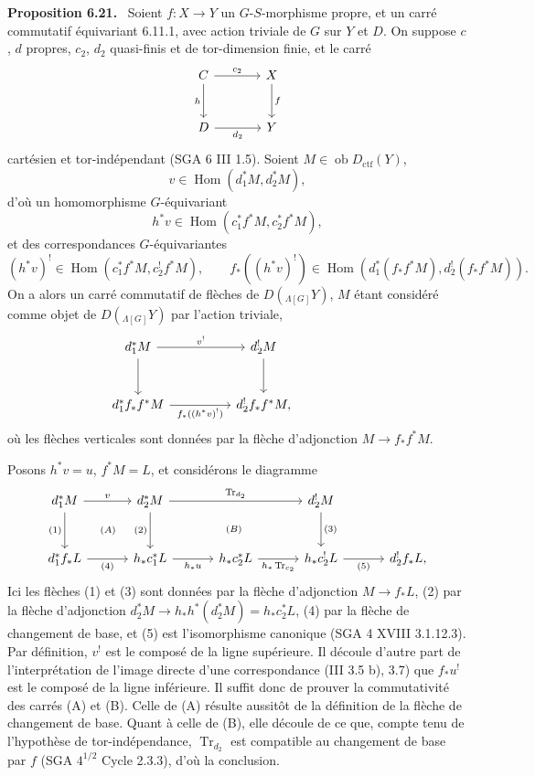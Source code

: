 \documentclass[11pt]{article}
\newenvironment{statement}[1]{\par\medskip\noindent\textbf{#1.}\ }{\par\medskip}
\DeclareMathOperator{\Hom}{Hom}
\providecommand{\Tr}{\operatorname{Tr}}
\providecommand{\Tr}{\operatorname{Tr}}
\providecommand{\Ob}{\operatorname{ob}}
\providecommand{\Tr}{\operatorname{Tr}}
\providecommand{\Hom}{\operatorname{Hom}}
\providecommand{\Ob}{\operatorname{ob}}
\providecommand{\Tr}{\operatorname{Tr}}
\providecommand{\Ob}{\operatorname{Ob}}
\providecommand{\Hom}{\operatorname{Hom}}
\providecommand{\Tr}{\operatorname{Tr}}
\providecommand{\Ob}{\operatorname{ob}}
\providecommand{\Ob}{\operatorname{Ob}}
\begin{document}
\begin{statement}{Proposition 6.21}
Soient $f:X\to Y$ un $G$-$S$-morphisme propre, et un carré commutatif équivariant 6.11.1, avec action triviale de $G$ sur $Y$ et $D$. On suppose $c$, $d$ propres, $c_2$, $d_2$ quasi-finis et de tor-dimension finie, et le carré
\[
\begin{tikzcd}[column sep=large,row sep=large]
C \arrow[r,"c_2"] \arrow[d,"h"'] & X \arrow[d,"f"]\\
D \arrow[r,"d_2"'] & Y
\end{tikzcd}
\]
cartésien et tor-indépendant (SGA 6 III 1.5). Soient $M\in\Ob D_{\mathrm{ctf}}(Y)$,
\[
v\in\Hom(d_1^*M,d_2^*M),
\]
d'où un homomorphisme $G$-équivariant
\[
h^*v\in\Hom(c_1^*f^*M,c_2^*f^*M),
\]
et des correspondances $G$-équivariantes
\[
(h^*v)^!\in\Hom(c_1^*f^*M,c_2^!f^*M),
\qquad
f_*((h^*v)^!)\in\Hom(d_1^*(f_*f^*M),d_2^!(f_*f^*M)).
\]
On a alors un carré commutatif de flèches de $D({}_{\Lambda[G]}Y)$, $M$ étant considéré comme objet de $D({}_{\Lambda[G]}Y)$ par l'action triviale,
\[
\begin{tikzcd}[column sep=huge,row sep=large]
d_1^*M \arrow[r,"v^!"] \arrow[d] & d_2^!M \arrow[d] & {}\\
d_1^*f_*f^*M \arrow[r,"f_*((h^*v)^!)"'] & d_2^!f_*f^*M,
\end{tikzcd}
\]
où les flèches verticales sont données par la flèche d'adjonction $M\to f_*f^*M$.
\end{statement}

Posons $h^*v=u$, $f^*M=L$, et considérons le diagramme
\[
\begin{tikzcd}[column sep=3.2em,row sep=large]
d_1^*M \arrow[r,"v"] \arrow[d,"{(1)}"'] &
d_2^*M \arrow[rr,"\Tr_{d_2}"] \arrow[d,"{(2)}"'] &&
d_2^!M \arrow[d,"{(3)}"] & {}\\
d_1^*f_*L \arrow[r,"{(4)}"'] &
h_*c_1^*L \arrow[r,"h_*u"'] &
h_*c_2^*L \arrow[r,"h_*\Tr_{c_2}"'] &
h_*c_2^!L \arrow[r,"{(5)}"'] &
d_2^!f_*L,
\arrow[from=1-1,to=2-2, phantom, "\scriptstyle (A)"]
\arrow[from=1-2,to=2-4, phantom, "\scriptstyle (B)"]
\end{tikzcd}
\]
Ici les flèches (1) et (3) sont données par la flèche d'adjonction $M\to f_*L$, (2) par la flèche d'adjonction $d_2^*M\to h_*h^*(d_2^*M)=h_*c_2^*L$, (4) par la flèche de changement de base, et (5) est l'isomorphisme canonique (SGA 4 XVIII 3.1.12.3). Par définition, $v^!$ est le composé de la ligne supérieure. Il découle d'autre part de l'interprétation de l'image directe d'une correspondance (III 3.5 b), 3.7) que $f_*u^!$ est le composé de la ligne inférieure. Il suffit donc de prouver la commutativité des carrés (A) et (B). Celle de (A) résulte aussitôt de la définition de la flèche de changement de base. Quant à celle de (B), elle découle de ce que, compte tenu de l'hypothèse de tor-indépendance, $\Tr_{d_2}$ est compatible au changement de base par $f$ (SGA $4^{1/2}$ Cycle 2.3.3), d'où la conclusion.
\end{document}
